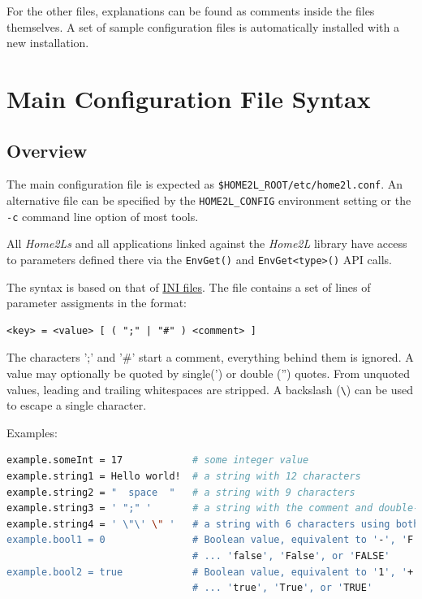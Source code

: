 \documentclass[12pt,english,parskip=half]{scrreprt}
\makeatletter
\newcommand{\toollabel}[1]{\index{#1@\texttt{#1} (tool)} \label{tool:#1}}
\makeatother
\begin{document}
For the other files, explanations can be found as comments inside the files themselves.
A set of sample configuration files is automatically installed with a new installation.





\section{Main Configuration File Syntax}
\label{sec:home2lconf}
\toollabel{home2l.conf}




\subsection{Overview}
\label{sec:home2lconf-overview}

The main configuration file is expected as \texttt{\$HOME2L\_ROOT/etc/home2l.conf}.
An alternative file can be specified by the \texttt{HOME2L\_CONFIG} environment
setting or the \texttt{-c} command line option of most tools.

All \emph{Home2Ls} and all applications linked against the
\emph{Home2L} library have access to parameters defined there via the
\texttt{EnvGet()} and \texttt{EnvGet<type>()} API calls.

The syntax is based on that of
\href{https://en.wikipedia.org/wiki/INI_file}{INI files}. The file
contains a set of lines of parameter assigments in the format:

\begin{lstlisting}
<key> = <value> [ ( ";" | "#" ) <comment> ]
\end{lstlisting}

The characters ';' and '\#' start a comment, everything behind
them is ignored. A value may optionally be quoted by single(')
or double ('') quotes. From unquoted values, leading and
trailing whitespaces are stripped. A backslash (\texttt{\textbackslash}) can be
used to escape a single character.

Examples:

\begin{lstlisting}[language=bash]
example.someInt = 17            # some integer value
example.string1 = Hello world!  # a string with 12 characters
example.string2 = "  space  "   # a string with 9 characters
example.string3 = ' ";" '       # a string with the comment and double-quote character
example.string4 = ' \"\' \" '   # a string with 6 characters using both types of quotes
example.bool1 = 0               # Boolean value, equivalent to '-', 'F', 'f', ...
                                # ... 'false', 'False', or 'FALSE'
example.bool2 = true            # Boolean value, equivalent to '1', '+', 'T', 't', ...
                                # ... 'true', 'True', or 'TRUE'
\end{lstlisting}
\end{document}
